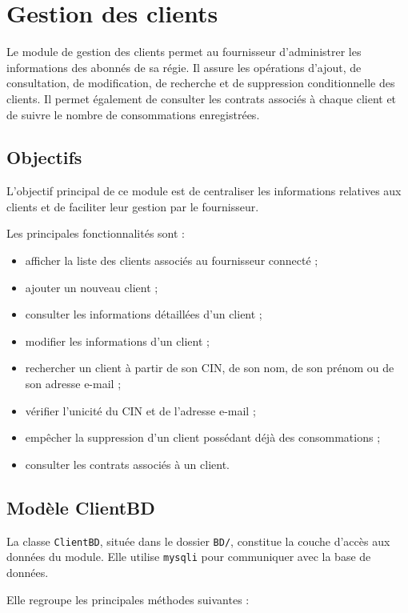 
\chapter{Gestion des clients}
\label{chap:clients}

Le module de gestion des clients permet au fournisseur d'administrer les informations des abonnés de sa régie. Il assure les opérations d'ajout, de consultation, de modification, de recherche et de suppression conditionnelle des clients. Il permet également de consulter les contrats associés à chaque client et de suivre le nombre de consommations enregistrées.

\section{Objectifs}

L'objectif principal de ce module est de centraliser les informations relatives aux clients et de faciliter leur gestion par le fournisseur.

Les principales fonctionnalités sont :
\begin{itemize}[leftmargin=*]
    \item afficher la liste des clients associés au fournisseur connecté ;
    \item ajouter un nouveau client ;
    \item consulter les informations détaillées d'un client ;
    \item modifier les informations d'un client ;
    \item rechercher un client à partir de son CIN, de son nom, de son prénom ou de son adresse e-mail ;
    \item vérifier l'unicité du CIN et de l'adresse e-mail ;
    \item empêcher la suppression d'un client possédant déjà des consommations ;
    \item consulter les contrats associés à un client.
\end{itemize}

\section{Modèle ClientBD}

La classe \texttt{ClientBD}, située dans le dossier \texttt{BD/}, constitue la couche d'accès aux données du module. Elle utilise \texttt{mysqli} pour communiquer avec la base de données.

Elle regroupe les principales méthodes suivantes :

